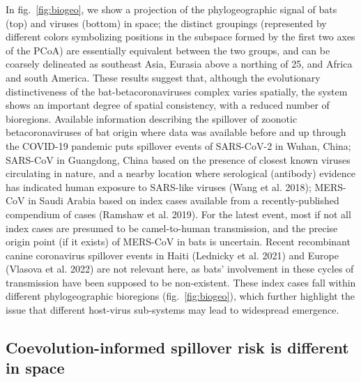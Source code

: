\documentclass[11pt]{article}
\begin{document}
In fig.~\ref{fig:biogeo}, we show a projection of the phylogeographic
signal of bats (top) and viruses (bottom) in space; the distinct
groupings (represented by different colors symbolizing positions in the
subspace formed by the first two axes of the PCoA) are essentially
equivalent between the two groups, and can be coarsely delineated as
southeast Asia, Eurasia above a northing of 25, and Africa and south
America. These results suggest that, although the evolutionary
distinctiveness of the bat-betacoronaviruses complex varies spatially,
the system shows an important degree of spatial consistency, with a
reduced number of bioregions. Available information describing the
spillover of zoonotic betacoronaviruses of bat origin where data was
available before and up through the COVID-19 pandemic puts spillover
events of SARS-CoV-2 in Wuhan, China; SARS-CoV in Guangdong, China based
on the presence of closest known viruses circulating in nature, and a
nearby location where serological (antibody) evidence has indicated
human exposure to SARS-like viruses (Wang et al. 2018); MERS-CoV in
Saudi Arabia based on index cases available from a recently-published
compendium of cases (Ramshaw et al. 2019). For the latest event, most if
not all index cases are presumed to be camel-to-human transmission, and
the precise origin point (if it exists) of MERS-CoV in bats is
uncertain. Recent recombinant canine coronavirus spillover events in
Haiti (Lednicky et al. 2021) and Europe (Vlasova et al. 2022) are not
relevant here, as bats' involvement in these cycles of transmission have
been supposed to be non-existent. These index cases fall within
different phylogeographic bioregions (fig.~\ref{fig:biogeo}), which
further highlight the issue that different host-virus sub-systems may
lead to widespread emergence.

\hypertarget{coevolution-informed-spillover-risk-is-different-in-space}{%
\subsection{Coevolution-informed spillover risk is different in
space}\label{coevolution-informed-spillover-risk-is-different-in-space}}
\end{document}
